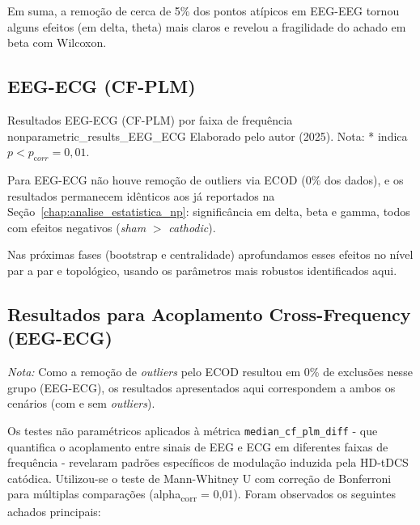 Em suma, a remoção de cerca de 5\% dos pontos atípicos em EEG-EEG tornou alguns efeitos (em delta, theta) mais claros e revelou a fragilidade do achado em beta com Wilcoxon.

\subsection{EEG-ECG (CF-PLM)}

{Resultados EEG-ECG (CF-PLM) por faixa de frequência}
{nonparametric_results_EEG_ECG}
{Elaborado pelo autor (2025). Nota: * indica $p<p_{\mathrm corr}=0{,}01$.}

Para EEG-ECG não houve remoção de outliers via ECOD (0\% dos dados), e os resultados permanecem idênticos aos já reportados na Seção~\ref{chap:analise_estatistica_np}: significância em delta, beta e gamma, todos com efeitos negativos (\textit{sham} $>$ \textit{cathodic}).

\bigskip
\noindent Nas próximas fases (bootstrap e centralidade) aprofundamos esses efeitos no nível par a par e topológico, usando os parâmetros mais robustos identificados aqui.

\subsection{Resultados para Acoplamento Cross-Frequency (EEG-ECG)}

\vspace{0.3em}
\noindent\textit{Nota:} Como a remoção de \textit{outliers} pelo ECOD resultou em 0\% de exclusões nesse grupo (EEG-ECG), os resultados apresentados aqui correspondem a ambos os cenários (com e sem \textit{outliers}).

Os testes não paramétricos aplicados à métrica \texttt{median\_cf\_plm\_diff} - que quantifica o acoplamento entre sinais de EEG e ECG em diferentes faixas de frequência - revelaram padrões específicos de modulação induzida pela HD-tDCS catódica. Utilizou-se o teste de Mann-Whitney U com correção de Bonferroni para múltiplas comparações (alpha\textsubscript{corr} = 0{,}01). Foram observados os seguintes achados principais:

